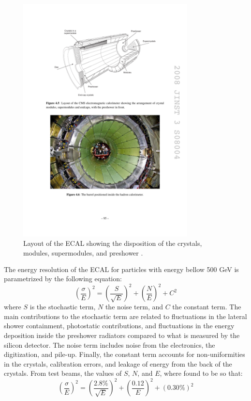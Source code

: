     \begin{figure}[h!]
      \centering
      \includegraphics[width=0.8\textwidth]{img/I-3-cms/ecal.pdf}
      \caption{Layout of the ECAL showing the disposition of the crystals, modules, supermodules, and preshower \cite{1748-0221-3-08-S08004}.}
      \label{fig:I-3-ecal}
    \end{figure}

    The energy resolution of the ECAL for particles with energy bellow 500 GeV is parametrized by the following equation:
    \begin{equation}
      \left( \frac{\sigma}{E} \right)^2 = \left( \frac{S}{\sqrt{E}} \right)^2 + \left( \frac{N}{E} \right)^2 + C^2
    \end{equation}
    where $ S $ is the stochastic term, $ N $ the noise term, and $ C $ the constant term. The main contributions to the stochastic term are related to fluctuations in the lateral shower containment, photostatic contributions, and fluctuations in the energy deposition inside the preshower radiators compared to what is measured by the silicon detector. The noise term includes noise from the electronics, the digitization, and pile-up. Finally, the constant term accounts for non-uniformities in the crystals, calibration errors, and leakage of energy from the back of the crystals. From test beams, the values of $ S $, $ N $, and $ E $, where found to be so that: \\
    \begin{equation}
      \left( \frac{\sigma}{E} \right)^2 = \left( \frac{2.8\%}{\sqrt{E}} \right)^2 + \left( \frac{0.12}{E} \right)^2 + (0.30\%)^2
    \end{equation}

